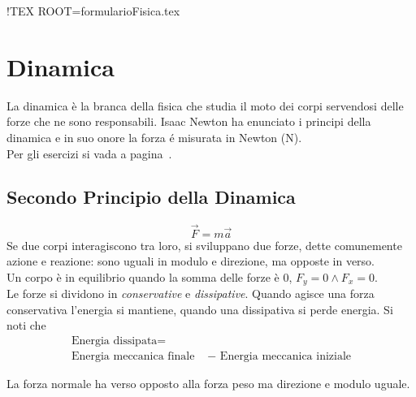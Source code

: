 !TEX ROOT=formularioFisica.tex

\section{Dinamica}\label{sec:dinamica}
La dinamica è la branca della fisica che studia il moto dei corpi servendosi delle forze che ne
sono responsabili. Isaac Newton ha enunciato i principi della dinamica e in suo onore la forza é 
  misurata in Newton (N).\\
Per gli esercizi si vada a pagina~\pageref{ex:dinamica}.
\subsection{Secondo Principio della Dinamica}
\begin{equation*}
\vec{F} = m\vec{a}
\end{equation*}
Se due corpi interagiscono tra loro, si sviluppano due forze, dette comunemente azione e reazione: 
sono uguali in modulo e direzione, ma opposte in verso.\\
Un corpo è in equilibrio quando la somma delle forze è 0, $F_y = 0\land F_x = 0$.\\
Le forze si dividono in \emph{conservative} e \emph{dissipative}. Quando agisce una forza conservativa
l'energia si mantiene, quando una dissipativa si perde energia. Si noti che
\begin{align*}
  \text{Energia dissipata} =&\\
  \text{Energia meccanica finale } &- \text{ Energia meccanica iniziale}
\end{align*}

\begin{center}
\end{center}
La forza normale ha verso opposto alla forza peso ma direzione e modulo uguale.

